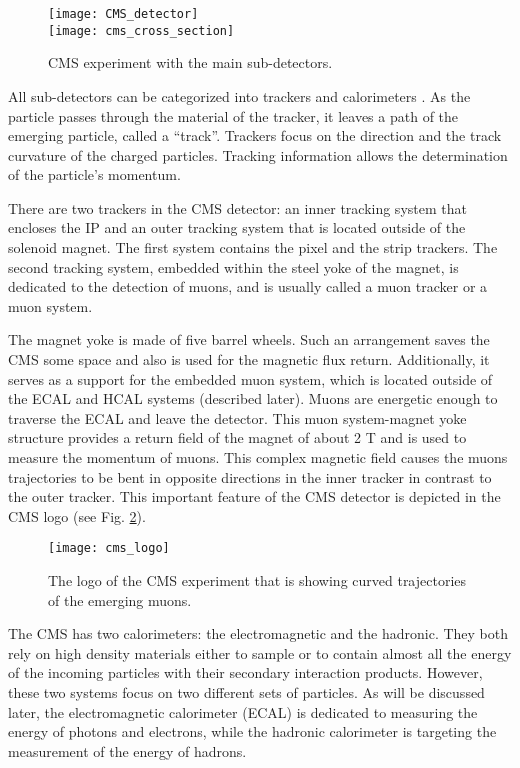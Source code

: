 \begin{normalsize}
\begin{figure}[H]
  \centering
  \texttt{[image: CMS\_detector]}\\
  \vspace{1cm}
  \texttt{[image: cms\_cross\_section]}
  \caption{CMS experiment with the main sub-detectors.}
  \label{CMS_detector}
\end{figure}

All sub-detectors can be categorized into trackers and calorimeters \cite{Hauptman:2011zza}. As the particle passes through the material of the tracker, it leaves a path of the emerging particle, called a ``track''. Trackers focus on the direction and the track curvature of the charged particles. Tracking information allows the determination of the particle's momentum. 

There are two trackers in the CMS detector: an inner tracking system that encloses the IP and an outer tracking system that is located outside of the solenoid magnet. The first system contains the pixel and the strip trackers. The second tracking system, embedded within the steel yoke of the magnet, is dedicated to the detection of muons, and is usually called a muon tracker or a muon system. 

The magnet yoke is made of five barrel wheels. Such an arrangement saves the CMS some space and also is used for the magnetic flux return. Additionally, it serves as a support for the embedded muon system, which is located outside of the ECAL and HCAL systems (described later). Muons are energetic enough to traverse the ECAL and leave the detector. This muon system-magnet yoke structure provides a return field of the magnet of about 2 T and is used to measure the momentum of muons. This complex magnetic field causes the muons trajectories to be bent in opposite directions in the inner tracker in contrast to the outer tracker. This important feature of the CMS detector is depicted in the CMS logo (see Fig. \ref{cms_logo}). 

\begin{figure}[H]
  \centering
  \texttt{[image: cms\_logo]}
  \caption{The logo of the CMS experiment that is showing curved trajectories of the emerging muons.}
  \label{cms_logo}
\end{figure}


The CMS has two calorimeters: the electromagnetic and the hadronic. They both rely on high density materials either to sample or to contain almost all the energy of the incoming particles with their secondary interaction products. However, these two systems focus on two different sets of particles. As will be discussed later, the electromagnetic calorimeter (ECAL) is dedicated to measuring the energy of photons and electrons, while the hadronic calorimeter is targeting the measurement of the energy of hadrons.



\end{normalsize}
